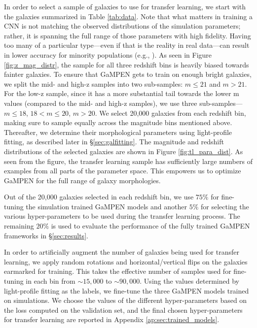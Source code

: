 \documentclass[linenumbers,twocolumn,twocolappendix]{aastex631}
\newcommand\gampen{GaMPEN}
\begin{document}
\begin{CJK*}{UTF8}{gbsn}
In order to select a sample of galaxies to use for transfer learning, we start with the galaxies summarized in Table \ref{tab:data}. Note that what matters in training a CNN is not matching the observed distributions of the simulation parameters; rather, it is spanning the full range of those parameters with high fidelity. Having too many of a particular type---even if that is the reality in real data---can result in lower accuracy for minority populations (e.g., \citealp{gamornet_paper}). As seen in Figure \ref{fig:z_mag_distr}, the sample for all three redshift bins is heavily biased towards fainter galaxies. To ensure that \gampen{} gets to train on enough bright galaxies, we split the mid- and high-z samples into two sub-samples: $m \leq 21$ and $m > 21$. For the low-z sample, since it has a more substantial tail towards the lower m values (compared to the mid- and high-z samples), we use  three sub-samples---$m \leq 18$, $18 < m \leq 20$, $m > 20$. We select 20,000 galaxies from each redshift bin, making sure to sample equally across the magnitude bins mentioned above. Thereafter, we determine their morphological parameters using light-profile fitting, as described later in \S \ref{sec:galfitting}. The magnitude and redshift distributions of the selected galaxies are shown in Figure \ref{fig:tl_para_dist}. As seen from the figure, the transfer learning sample has sufficiently large numbers of examples from all parts of the parameter space. This empowers us to optimize \gampen{} for the full range of galaxy morphologies.

Out of the 20,000 galaxies selected in each redshift bin, we use $75\%$ for fine-tuning the simulation trained \gampen{} models and another $5\%$ for selecting the various hyper-parameters to be used during the transfer learning process. The remaining $20\%$ is used to evaluate the performance of the fully trained \gampen{} frameworks in \S \ref{sec:results}.

In order to artificially augment the number of galaxies being used for transfer learning, we apply random rotations and horizontal/vertical flips on the galaxies earmarked for training. This takes the effective number of samples used for fine-tuning in each bin from $\sim15,000$ to $\sim90,000$. Using the values determined by light-profile fitting as the labels, we fine-tune the three \gampen{} models trained on simulations. We choose the values of the different hyper-parameters based on the loss computed on the validation set, and the final chosen hyper-parameters for transfer learning are reported in Appendix \ref{ap:sec:trained_models}. 
    

\end{CJK*}
\end{document}
